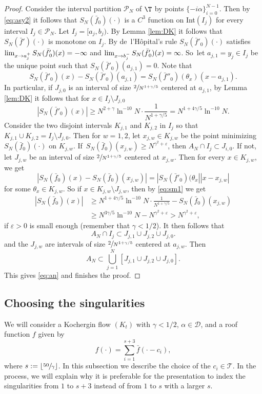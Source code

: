 \documentclass[JEP,XML,SOM,Unicode,NoFloatCountersInSection]{cedram}
\let\DS\relax
\newcommand\cD{\mathcal{D}}
\newcommand\cP{\mathcal{P}}
\newcommand\cT{\mathcal{T}}
\let\eps\varepsilon
\theoremstyle{definition}
\theoremstyle{plain}
\begin{document}
\begin{proof}
Consider the interval partition $\cP_N$ of $\T$ by points $\{-i\alpha\}_{i=0}^{N-1}$. Then by \eqref{eq:asy2} it follows that $S_N(\bar{f}_0)(\cdot)$ is a $C^3$ function on Int$(I_j)$ for every interval $I_j\in \cP_N$. Let $I_j=[a_j,b_j)$. By Lemma \ref{lem:DK} it follows that $S_N(\bar{f}{}')(\cdot)$ is monotone on $I_j$. By de~l'Hôpital's rule
$S_N(\bar{f}{}'_0)(\cdot)$ satisfies $\DS \lim_{x\to a_j^+}S_N(\bar{f}{}'_0)(x)=-\infty$ and
$\DS \lim_{x\to b_j^-}S_N(\bar{f}{}'_0)(x)=\infty$. So~let $a_{j,1}=y_j\in I_j$ be the unique
point such that $S_N(\bar{f}{}'_0)(a_{j,1})=0$. Note that
\[
S_N(\bar{f}{}'_0)(x)-S_N(\bar{f}{}'_0)(a_{j,1})=S_N(\bar{f}{}''_0)(\theta_x)(x-a_{j,1}).
\]
In particular, if $J_{j,0}$ is an interval of size $\sfrac{2}{N^{1+\gamma/5}}$ centered at $a_{j,1}$, by Lemma \ref{lem:DK} it follows that for $x\in I_j\setminus J_{j,0}$
\begin{equation}\label{eq:sm1}
|S_N(\bar{f}{}'_0)(x)|\geq N^{2+\gamma}\ln^{-10}N \cdot \frac{1}{N^{1+\gamma/5}}= N^{1+4\gamma/5}\ln^{-10}N.
\end{equation}
Consider the two disjoint intervals $K_{j,1}$ and $K_{j,2}$ in $I_j$ so that $K_{j,1}\cup K_{j,2}=I_j\setminus J_{j,0}$. Then for $w=1,2$, let $x_{j,w}\in K_{j,w}$ be the point minimizing $S_N(\bar{f}_0)(\cdot)$ on $K_{j,w}$. If~$S_N(\bar{f}_0)(x_{j,w})\geq N^{\gamma^2+\eps}$, then $A_N\cap I_j\subset J_{i,0}$. If not, let $J_{j,w}$ be an interval of size $\sfrac{2}{N^{1+\gamma/5}}$ centered at $x_{j,w}$. Then for every $x\in K_{j,w}$, we get
\[
|S_N(\bar{f}_0)(x)-S_N(\bar{f}_0)(x_{j,w})|=|S_N(\bar{f}{}'_0)(\theta_x||x-x_{j,w}|
\]
for some $\theta_x\in K_{j,w}$. So if $x\in K_{j,w}\setminus J_{j,w}$, then by \eqref{eq:sm1} we get
\begin{align*}
|S_N(\bar{f}_0)(x)|&\geq N^{1+4\gamma/5}\ln^{-10}N\cdot \frac{1}{N^{1+\gamma/5}}- S_N(\bar{f}_0)(x_{j,w})\\
&\geq N^{3\gamma/5}\ln^{-10}N -N^{\gamma^2+\eps}>N^{\gamma^2+\eps},
\end{align*}
if $\eps>0$ is small enough (remember that $\gamma<1/2$). It then follows that
\[
A_N\cap I_j\subset J_{j,1}\cup J_{j,2}\cup J_{j,0}.
\]
and the $J_{j,w}$ are intervals of size $\sfrac{2}{N^{1+\gamma/5}}$ centered at $a_{j,w}$. Then
\[
A_N\subset \bigcup_{j=1}^N[J_{j,1}\cup J_{j,2}\cup J_{j,0}].
\]
This gives \eqref{eq:an} and finishes the proof.
\end{proof}

\subsection{Choosing the singularities} \label{sec.singularities}
We will consider a Kochergin flow $(K_t)$ with $\gamma<1/2$, $\alpha\in \cD$, and a roof function $f$ given by
\begin{equation*}%
f(\cdot)=\sum_{i=1}^{s+3} \bar{f}(\cdot-c_i),
\end{equation*}
where $s:=\lfloor \sfrac{50}{\gamma} \rfloor$. In this subsection we describe the choice of the $c_i\in \cT$.
In the process, we will explain why it is preferable for the presentation to index the singularities from $1$ to $s+3$ instead of from $1$ to $s$ with a larger $s$.
\end{document}
